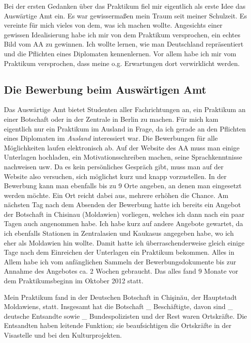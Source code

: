 \documentclass[12pt,a4paper, headsepline]{scrartcl}
\begin{document}
Bei der ersten Gedanken über das Praktikum fiel mir eigentlich als erste Idee das Auswärtige Amt ein. Es war gewissermaßen mein Traum seit meiner Schulzeit. Es vereinte für mich vieles von dem, was ich machen wollte. Angesichts einer gewissen Idealisierung habe ich mir von dem Praktikum versprochen, ein echtes Bild vom AA zu gewinnen. Ich wollte lernen, wie man Deutschland repräsentiert und die Pflichten eines Diplomaten kennenlernen. Vor allem habe ich mir vom Praktikum versprochen, dass meine o.g. Erwartungen dort verwirklicht werden. 

\subsection{Die Bewerbung beim Auswärtigen Amt}
Das Auswärtige Amt bietet Studenten aller Fachrichtungen an, ein Praktikum an einer Botschaft oder in der Zentrale in Berlin zu machen. Für mich kam eigentlich nur ein Praktikum im Ausland in Frage, da ich gerade an den Pflichten eines Diplomaten im \emph{Ausland} interessiert war. Die Bewerbungen für alle Möglichkeiten laufen elektronisch ab. Auf der Website des AA muss man einige Unterlagen hochladen, ein Motivationsschreiben machen, seine Sprachkenntnisse nachweisen usw. Da es kein persönliches Gespräch gibt, muss man auf der Website also versuchen, sich möglichst kurz und knapp vorzustellen. In der Bewerbung kann man ebenfalls bis zu 9 Orte angeben, an denen man eingesetzt werden möchte. Ein Ort reicht dabei aus, mehrere erhöhen die Chance. Am nächsten Tag nach dem Absenden der Bewerbung hatte ich bereits ein Angebot der Botschaft in Chisinau (Moldawien) vorliegen, welches ich dann nach ein paar Tagen auch angenommen habe. Ich habe kurz auf andere Angebote gewartet, da ich ebenfalls Stationen in Zentralasien und Kaukasus angegeben habe, wo ich eher als Moldawien hin wollte. Damit hatte ich überraschenderweise gleich einige Tage nach dem Einreichen der Unterlagen ein Praktikum bekommen. Alles in Allem habe ich vom anfänglichen Sammeln der Bewerbungsdokumente bis zur Annahme des Angebotes ca. 2 Wochen gebraucht. Das alles fand 9 Monate vor dem Praktikumsbeginn im Oktober 2012 statt.

Mein Praktikum fand in der Deutschen Botschaft in Chişinău, der Hauptstadt Moldawiens, statt. Insgesamt hat die Botschaft \_ Beschäftigte, davon sind \_ deutsche Entsandte sowie \_ Bundespolizisten und der Rest waren Ortskräfte. Die Entsandten haben leitende Funktion; sie beaufsichtigen die Ortskräfte in der Visastelle und bei den Kulturprojekten.
\end{document}
